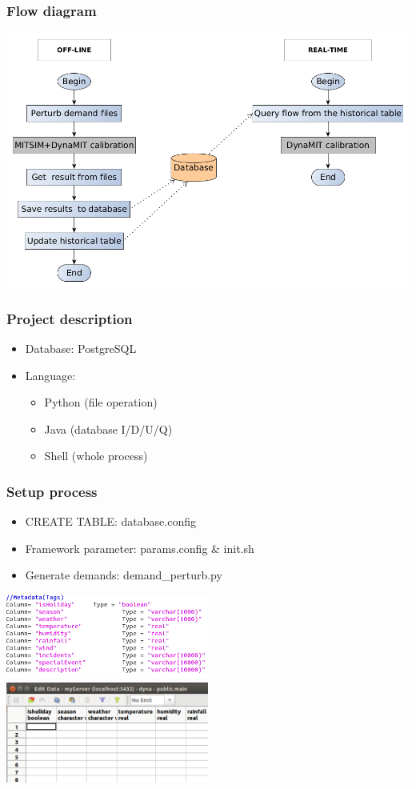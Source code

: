 \documentclass[12pt]{beamer}
\begin{document}
\begin{frame}
\frametitle{Flow diagram}
\includegraphics[width = 1.0\textwidth]{flow-chart.png}
\end{frame}

\begin{frame}
\frametitle{Project description}
\begin{itemize}
\item Database: PostgreSQL
\item Language: 
\begin{itemize}
      \item{Python (file operation)}
      \item{Java (database I/D/U/Q)}
      \item{Shell (whole process)}
\end{itemize}
\end{itemize}
\end{frame}



\begin{frame}
\frametitle{Setup process}
\begin{itemize}
\item CREATE TABLE: database.config
\item Framework parameter: params.config \& init.sh
\item Generate demands: demand\_perturb.py 
\end{itemize}
\includegraphics[width = 0.5\textwidth]{screenshot_table.png}
\includegraphics[width = 0.5\textwidth]{screenshot_pgadmin.png}
\end{frame}
\end{document}
